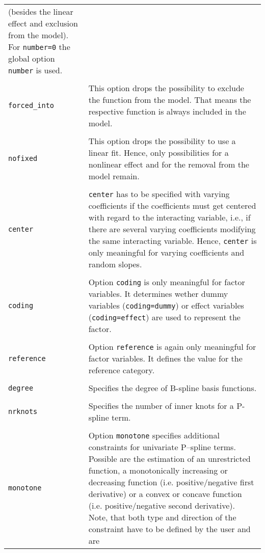 \begin{longtable}{p{2.2cm} p{13.3cm}}
               (besides the linear effect and exclusion from the model). For {\tt number=0} the
               global option {\tt number} is used. \\
            & \\
{\tt forced\_into} & This option drops the possibility to exclude the function from the model. That means the respective function
                     is always included in the model. \\
            & \\
{\tt nofixed} & This option drops the possibility to use a linear fit. Hence, only possibilities
for a nonlinear effect and for the removal from the model remain. \\
            & \\
{\tt center} & {\tt center} has to be specified with varying coefficients if the
               coefficients must get centered with regard to the interacting variable, i.e., if
               there are several varying coefficients modifying the same interacting variable.
               Hence, {\tt center} is only meaningful for varying coefficients and random slopes. \\
            & \\
{\tt coding} & Option {\tt coding} is only meaningful for factor variables. It determines wether
               dummy variables ({\tt coding=dummy}) or effect variables ({\tt coding=effect})
               are used to represent the factor. \\
            & \\
{\tt reference} & Option {\tt reference} is again only meaningful for factor variables. It defines
                  the value for the reference category. \\
            & \\
{\tt degree} & Specifies the degree of B-spline basis functions. \\
            & \\
{\tt nrknots} & Specifies the number of inner knots for a P-spline term. \\
            & \\
{\tt monotone} & Option {\tt monotone} specifies additional constraints for univariate
                 P--spline terms. Possible are the estimation of an unrestricted function,
                 a monotonically increasing or decreasing function (i.e. positive/negative first derivative)
                 or a convex or concave function (i.e. positive/negative second derivative).
                 Note, that both type and direction of the constraint have to be defined by the user and are

\end{longtable}
